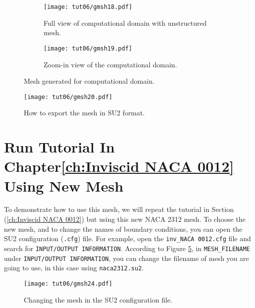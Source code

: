\begin{figure}[ht]
    \centering
     \begin{subfigure}[b]{.5\textwidth}
         \centering
         \texttt{[image: tut06/gmsh18.pdf]}
         \caption{Full view of computational domain with unstructured mesh.}
         \label{fig6:gmsh18 a}
     \end{subfigure}
     \hfill
     \begin{subfigure}[b]{.5\textwidth}
         \centering
         \texttt{[image: tut06/gmsh19.pdf]}
         \caption{Zoom-in view of the computational domain.}
         \label{fig6:gmsh18 b}
     \end{subfigure}  
    \caption{Mesh generated for computational domain.}
    \label{fig6:gmsh18}
\end{figure}
\begin{figure}[H]
    \centering
    \texttt{[image: tut06/gmsh20.pdf]}
    \caption{How to export the mesh in SU2 format.}
    \label{fig6:gmsh20}
\end{figure}
\section*{Run Tutorial In Chapter\ref{ch:Inviscid NACA 0012} Using New Mesh}
To demonstrate how to use this mesh, we will repeat the tutorial in Section (\ref{ch:Inviscid NACA 0012}) but using this new NACA 2312 mesh. To choose the new mesh, and to change the names of boundary conditions, you can open the SU2 configuration (\texttt{.cfg}) file. For example, open the \texttt{inv\_NACA 0012.cfg} file and search for \texttt{INPUT/OUTPUT INFORMATION}. According to Figure \ref{fig6:gmsh24}, in \texttt{MESH\_FILENAME} under \texttt{INPUT/OUTPUT INFORMATION}, you can change the filename of mesh you are going to use, in this case using \texttt{naca2312.su2}.
\begin{figure}[ht]
    \centering
    \texttt{[image: tut06/gmsh24.pdf]}
    \caption{Changing the mesh in the SU2 configuration file.}
    \label{fig6:gmsh24}
\end{figure}

